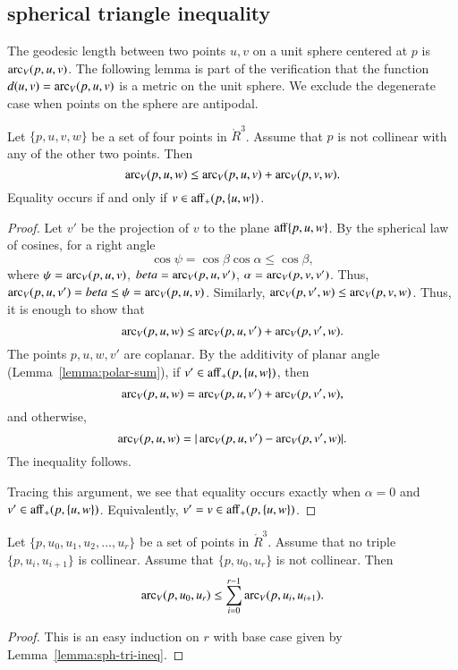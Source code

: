 \subsection{spherical triangle inequality}

The geodesic length between two points
$u,v$ on a unit sphere centered at $p$ is $\operatorname{arc}_V(p,u,v)$.
The following lemma is part of the verification that
the function $d(u,v) = \operatorname{arc}_V(p,u,v)$ is a metric
on the unit sphere.  We exclude the degenerate case when
points on the sphere are antipodal.

\begin{lemma}\label{lemma:sph-tri-ineq}
Let $\{p,u,v,w\}$ be a set of four points in $\ring{R}^3$.
Assume that $p$ is not collinear with any of the other two points.
Then
   $$
   \operatorname{arc}_V(p,u,w) \le \operatorname{arc}_V(p,u,v) + \operatorname{arc}_V(p,v,w).
   $$
Equality occurs if and only if $v\in{\operatorname{aff}}_+(p,\{u,w\})$.
\end{lemma}

\begin{proof} Let $v'$ be the projection of $v$ to the plane
${\operatorname{aff}}\{p,u,w\}$.  
By the spherical law of cosines, for a right angle
   $$
   \cos\psi = \cos\beta\cos\alpha \le \cos\beta,
   $$
where $\psi = \operatorname{arc}_V(p,u,v)$, $beta = \operatorname{arc}_V(p,u,v')$, $\alpha=\operatorname{arc}_V(p,v,v')$.
Thus, $\operatorname{arc}_V(p,u,v')=beta\le \psi=\operatorname{arc}_V(p,u,v)$.
Similarly, $\operatorname{arc}_V(p,v',w) \le \operatorname{arc}_V(p,v,w)$.
Thus, it is enough to show that 
  $$
  \operatorname{arc}_V(p,u,w) \le \operatorname{arc}_V(p,u,v') + \operatorname{arc}_V(p,v',w).
  $$
The points $p,u,w,v'$ are coplanar.
By the additivity of planar angle (Lemma~\ref{lemma:polar-sum}), if 
$v'\in {\operatorname{aff}}_+(p,\{u,w\})$, then
   $$
   \operatorname{arc}_V(p,u,w) = \operatorname{arc}_V(p,u,v') + \operatorname{arc}_V(p,v',w),   
   $$
and otherwise,
   $$
   \operatorname{arc}_V(p,u,w) = |\operatorname{arc}_V(p,u,v') - \operatorname{arc}_V(p,v',w)|.
   $$
The inequality follows.

Tracing this argument, we see that equality occurs exactly when
$\alpha=0$ and $v'\in {\operatorname{aff}}_+(p,\{u,w\})$.  Equivalently,
$v'=v\in{\operatorname{aff}}_+(p,\{u,w\})$.
\end{proof}

\begin{lemma}\label{lemma:sph-tri-multi}
Let $\{p,u_0,u_1,u_2,\ldots,u_r\}$ be a set of points in $\ring{R}^3$.
Assume that no triple $\{p,u_i,u_{i+1}\}$ is collinear.  Assume
that $\{p,u_0,u_r\}$ is not collinear.  Then
$$
  \operatorname{arc}_V(p,u_0,u_r) \le \sum_{i=0}^{r-1} \operatorname{arc}_V(p,u_i,u_{i+1}).
$$
\end{lemma}

\begin{proof} This is an easy induction on $r$ with base
case given by Lemma~\ref{lemma:sph-tri-ineq}.
\end{proof}


